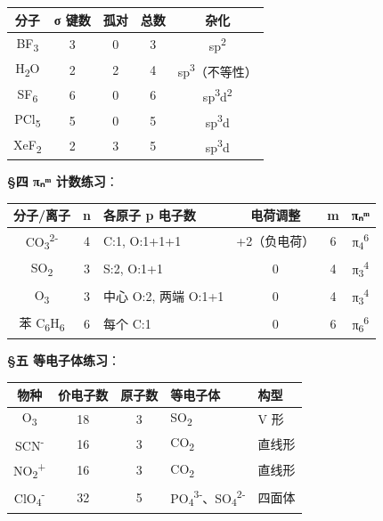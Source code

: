 \documentclass[a4paper,11pt]{ctexart}
\newcounter{none}
\begin{document}
{\def\LTcaptype{none} %
\begin{longtable}[]{@{}ccccc@{}}
\toprule\noalign{}
分子 & σ 键数 & 孤对 & 总数 & 杂化 \\
\midrule\noalign{}
\endhead
\bottomrule\noalign{}
\endlastfoot
BF\textsubscript{3} & 3 & 0 & 3 & sp\textsuperscript{2} \\
H\textsubscript{2}O & 2 & 2 & 4 & sp\textsuperscript{3}（不等性） \\
SF\textsubscript{6} & 6 & 0 & 6 & sp\textsuperscript{3}d\textsuperscript{2} \\
PCl\textsubscript{5} & 5 & 0 & 5 & sp\textsuperscript{3}d \\
XeF\textsubscript{2} & 2 & 3 & 5 & sp\textsuperscript{3}d \\
\end{longtable}
}

\textbf{§四 πₙᵐ 计数练习}：

{\def\LTcaptype{none} %
\begin{longtable}[]{@{}cclccc@{}}
\toprule\noalign{}
分子/离子 & n & 各原子 p 电子数 & 电荷调整 & m & πₙᵐ \\
\midrule\noalign{}
\endhead
\bottomrule\noalign{}
\endlastfoot
CO\textsubscript{3}\textsuperscript{2-} & 4 & C:1, O:1+1+1 & +2（负电荷） & 6 & π\textsubscript{4}\textsuperscript{6} \\
SO\textsubscript{2} & 3 & S:2, O:1+1 & 0 & 4 & π\textsubscript{3}\textsuperscript{4} \\
O\textsubscript{3} & 3 & 中心 O:2, 两端 O:1+1 & 0 & 4 & π\textsubscript{3}\textsuperscript{4} \\
苯 C\textsubscript{6}H\textsubscript{6} & 6 & 每个 C:1 & 0 & 6 & π\textsubscript{6}\textsuperscript{6} \\
\end{longtable}
}

\textbf{§五 等电子体练习}：

{\def\LTcaptype{none} %
\begin{longtable}[]{@{}cccll@{}}
\toprule\noalign{}
物种 & 价电子数 & 原子数 & 等电子体 & 构型 \\
\midrule\noalign{}
\endhead
\bottomrule\noalign{}
\endlastfoot
O\textsubscript{3} & 18 & 3 & SO\textsubscript{2} & V 形 \\
SCN\textsuperscript{-} & 16 & 3 & CO\textsubscript{2} & 直线形 \\
NO\textsubscript{2}\textsuperscript{+} & 16 & 3 & CO\textsubscript{2} & 直线形 \\
ClO\textsubscript{4}\textsuperscript{-} & 32 & 5 & PO\textsubscript{4}\textsuperscript{3-}、SO\textsubscript{4}\textsuperscript{2-} & 四面体 \\
\end{longtable}
}
\end{document}
